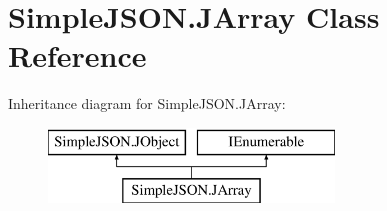 \hypertarget{class_simple_j_s_o_n_1_1_j_array}{\section{Simple\+J\+S\+O\+N.\+J\+Array Class Reference}
\label{class_simple_j_s_o_n_1_1_j_array}
}
Inheritance diagram for Simple\+J\+S\+O\+N.\+J\+Array\+:\begin{figure}[H]
\begin{center}
\leavevmode
\includegraphics[height=2.000000cm]{class_simple_j_s_o_n_1_1_j_array}
\end{center}
\end{figure}
